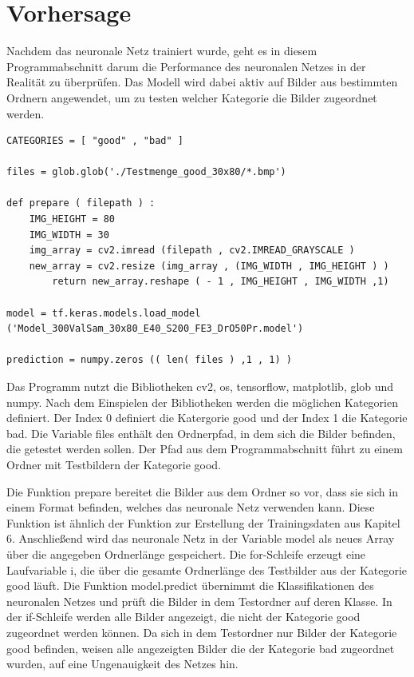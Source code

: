 \section{Vorhersage}

Nachdem das neuronale Netz trainiert wurde, geht es in diesem Programmabschnitt darum 
die Performance des neuronalen Netzes in der Realität zu überprüfen. Das Modell
wird dabei aktiv auf Bilder aus bestimmten Ordnern angewendet, um zu testen welcher
Kategorie die Bilder zugeordnet werden.

\begin{lstlisting}
CATEGORIES = [ "good" , "bad" ]

files = glob.glob('./Testmenge_good_30x80/*.bmp')

def prepare ( filepath ) :
    IMG_HEIGHT = 80
    IMG_WIDTH = 30
    img_array = cv2.imread (filepath , cv2.IMREAD_GRAYSCALE )
    new_array = cv2.resize (img_array , (IMG_WIDTH , IMG_HEIGHT ) )
        return new_array.reshape ( - 1 , IMG_HEIGHT , IMG_WIDTH ,1)

model = tf.keras.models.load_model ('Model_300ValSam_30x80_E40_S200_FE3_DrO50Pr.model')

prediction = numpy.zeros (( len( files ) ,1 , 1) )
\end{lstlisting}

Das Programm nutzt die Bibliotheken cv2, os, tensorflow, matplotlib, glob und numpy.
Nach dem Einspielen der Bibliotheken werden die möglichen Kategorien definiert. Der
Index 0 definiert die Katergorie good und der Index 1 die Kategorie bad. Die Variable files
enthält den Ordnerpfad, in dem sich die Bilder befinden, die getestet werden sollen. Der
Pfad aus dem Programmabschnitt führt zu einem Ordner mit Testbildern der Kategorie
good.

Die Funktion prepare bereitet die Bilder aus dem Ordner so vor, dass sie sich in einem
Format befinden, welches das neuronale Netz verwenden kann. Diese Funktion ist ähnlich
der Funktion zur Erstellung der Trainingsdaten aus Kapitel 6. Anschließend wird das
neuronale Netz in der Variable model als neues Array über die angegeben Ordnerlänge
gespeichert. Die for-Schleife erzeugt eine Laufvariable i, die über die gesamte Ordnerlänge
des Testbilder aus der Kategorie good läuft. Die Funktion model.predict übernimmt die
Klassifikationen des neuronalen Netzes und prüft die Bilder in dem Testordner auf deren 
Klasse. In der if-Schleife werden alle Bilder angezeigt, die nicht der Kategorie good
zugeordnet werden können. Da sich in dem Testordner nur Bilder der Kategorie good
befinden, weisen alle angezeigten Bilder die der Kategorie bad zugeordnet wurden, auf
eine Ungenauigkeit des Netzes hin.

